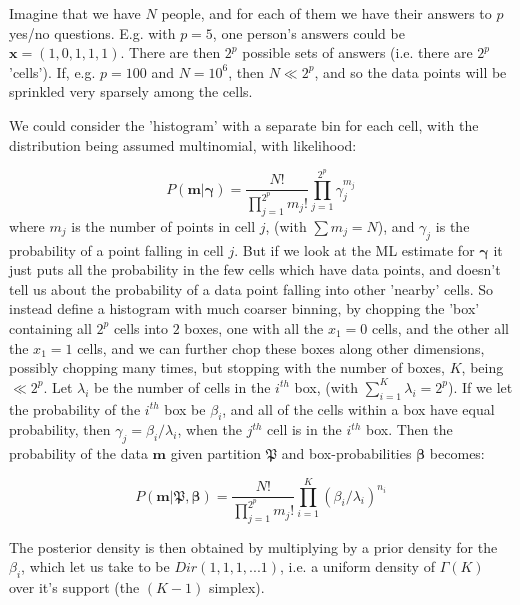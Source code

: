 \documentclass[14pt,english]{extarticle}
\begin{document}
\setlength{\unitlength}{1.4 mm}
 \pagestyle {empty} %
Imagine that we have $N$ people, and for each of them we have their answers to $p$ yes/no questions. E.g. with $p=5$, one person's answers could be $\boldsymbol{x} = (1,0,1,1,1)$. There are then $2^p$ possible sets of answers (i.e. there are $2^p$ 'cells'). If, e.g. $p=100$ and $N=10^6$, then $N \ll 2^p$, and so the data points will be sprinkled very sparsely among the cells. 

We could consider the 'histogram' with a separate bin for each cell, with the distribution being assumed multinomial, with likelihood:

$$ P(\boldsymbol{m} | \boldsymbol{\gamma}) =  \frac{N!}{\prod_{j=1}^{2^p}m_j!}  \prod_{j=1}^{2^p} \gamma_{j}^{m_j} $$
where $m_j$ is the number of points in cell $j$, (with $\sum m_j = N$), and $\gamma_j$ is the probability of a point falling in cell $j$. But if we look at the ML estimate for $\boldsymbol{\gamma}$ it just puts all the probability in the few cells which have data points, and doesn't tell us about the probability of a data point falling into other 'nearby' cells. 
So instead define a histogram with much coarser binning, by chopping the 'box' containing all $2^p$ cells into $2$ boxes, one with all the $x_1=0$ cells, and the other all the $x_1=1$ cells, and we can further chop these boxes along other dimensions, possibly chopping many times, but stopping with the number of boxes, $K$, being $ \ll 2^p$. Let $\lambda_i$ be the number of cells in the $i^{th}$ box, (with $\sum_{i=1}^{K}\lambda_i = 2^p$). If we let the probability of the $i^{th}$ box be $\beta_i$, and all of the cells within a box have equal probability, then $\gamma_j=\beta_i/\lambda_i$, when the $j^{th}$ cell is in the $i^{th}$ box. Then the probability of the data $\boldsymbol{m}$ given partition $\mathfrak{P}$ and box-probabilities $\boldsymbol{\beta}$ becomes:

$$ P(\boldsymbol{m} | \mathfrak{P}, \boldsymbol{\beta} ) =  \frac{N!}{\prod_{j=1}^{2^p}m_j!}  \prod_{i=1}^{K} ({\beta_{i}}/{\lambda_i})^{n_i} $$

The posterior density is then obtained by multiplying by a prior density for the $\beta_i$, which let us take to be $Dir(1,1,1,...1)$, i.e. a uniform density of $\Gamma(K)$ over it's support (the $(K-1)$ simplex).
\end{document}
